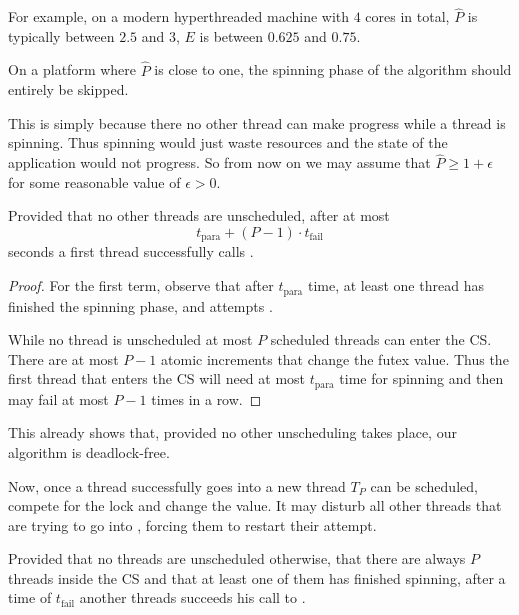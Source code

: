 For example, on a modern hyperthreaded machine with $4$ cores in
total, $\widehat{P}$ is typically between $2.5$ and $3$, $E$ is
between $0.625$ and $0.75$.

\begin{remark}
On a platform where $\widehat{P}$ is close to one, the spinning
phase of the algorithm should entirely be skipped.
\end{remark}

This is simply because there no other thread can make progress
while a thread is spinning. Thus spinning would just waste
resources and the state of the application would not progress.  So
from now on we may assume that $\widehat{P} \geq 1+\epsilon$ for some
reasonable value of $\epsilon > 0$.
\fi

\begin{lemma}
Provided that no other threads are unscheduled, after at most
$$t_{\textrm{para}} + (P-1)\cdot t_{\textrm{fail}}$$
seconds a first thread successfully calls .
\end{lemma}

\begin{proof}
For the first term, observe that after $t_{\textrm{para}}$ time,
at least one thread has finished the spinning phase, and attempts
.

While no thread is unscheduled at most $P$ scheduled threads can
enter the CS. There are at most $P-1$ atomic
increments that change the futex value. Thus the first thread that
enters the CS will need at most $t_{\textrm{para}}$
time for spinning and then  may fail at most $P-1$
times in a row.
\end{proof}

\iflong
This already shows that, provided no other unscheduling takes
place, our algorithm is deadlock-free.

Now, once a thread successfully goes into  a new
thread $T_P$ can be scheduled, compete for the lock and change the
 value. It may disturb all other threads that are trying to
go into , forcing them to restart their attempt.

\begin{remark}
Provided that no threads are unscheduled otherwise, that there are
always $P$ threads inside the CS and that at least one of them has
finished spinning, after a time of $t_{\textrm{fail}}$ another
threads succeeds his call to .
\end{remark}


